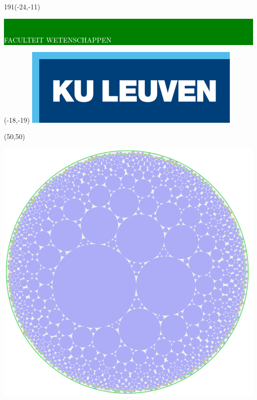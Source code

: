 \documentclass[12pt,a4paper,oneside]{book}
\begin{document}
\thispagestyle{empty}
\newcommand{\form}[1]{\scalebox{1.087}{\boldmath{#1}}}
\sffamily
%
\begin{textblock}{191}(-24,-11)
\colorbox{green}{\hspace{123mm}\ \parbox[c][18truemm]{68mm}{\textcolor{white}{FACULTEIT WETENSCHAPPEN}}}
\end{textblock}
%
\begin{textblock}{70}(-18,-19)
\textblockcolour{}
\includegraphics*[height=19.8truemm]{LogoKULeuven.png}
\end{textblock}
%
\begin{textblock}{79}(50,50)
\centerline{\includegraphics*[height=10.0truecm]{voorbladpacking_75.png}}
\end{textblock}
\end{document}
